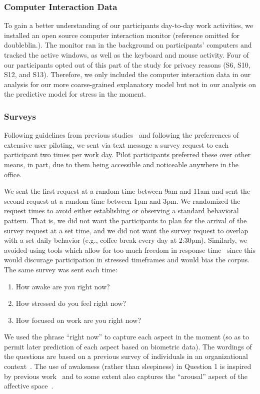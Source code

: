 \subsubsection{Computer Interaction Data}
To gain a better understanding of our participants day-to-day work activities, we installed an open source computer interaction monitor (reference omitted for doubleblin.). The monitor ran in the background on participants' computers and tracked the active windows, as well as the keyboard and mouse activity. Four of our participants opted out of this part of the study for privacy reasons (S6, S10, S12, and S13). Therefore, we only included the computer interaction data in our analysis for our more coarse-grained explanatory model but not in our analysis on the predictive model for stress in the moment. 

\subsubsection{Surveys}
\label{sec:Surveys}
Following guidelines from previous studies~\cite{Lalle16,Panwar18,Luo18} and 
following the preferrences of extensive user piloting, we sent via 
text message a survey request to each participant two times per 
work day. Pilot participants preferred these over other means, in part, due 
to them being accessible and noticeable anywhere in the office. 

We sent the 
first request at a random time between 9am and 11am 
and sent the second request at a random time between 1pm and 3pm. We 
randomized the request times to avoid either establishing or observing a 
standard behavioral pattern. That is, we did not want the participants to 
plan for the arrival of the survey request at a set time, and we did not 
want the survey request to overlap with a set daily behavior (e.g., coffee 
break every day at 2:30pm). Similarly, we avoided using tools which allow 
for too much freedom in response time~\cite{Adams18} since this would 
discurage participation in stressed timeframes and would bias the 
corpus. 
The same survey was sent each time:
\begin{enumerate}
\item How awake are you right now?
\item How stressed do you feel right now?
\item How focused on work are you right now? 
\end{enumerate}
We used the phrase ``right now'' to capture each aspect in the moment (so as to permit later prediction of each aspect based on biometric data). The wordings of the questions are based on a previous survey of individuals in an organizational context~\cite{Gloor_etal:2010}. The use of awakeness (rather than sleepiness) in Question 1 is inspired by previous work~\cite{Wilhelm_Schoebi:2007} and to some extent also captures the ``arousal'' aspect of the affective space~\cite{Russell:1980}.


